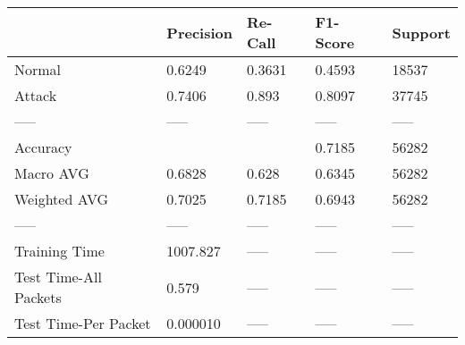 \begin{tabular}{lllll}
\toprule
{} & Precision & Re-Call & F1-Score & Support \\
\midrule
Normal                &    0.6249 &  0.3631 &   0.4593 &   18537 \\
Attack                &    0.7406 &   0.893 &   0.8097 &   37745 \\
-----                 &     ----- &   ----- &    ----- &   ----- \\
Accuracy              &           &         &   0.7185 &   56282 \\
Macro AVG             &    0.6828 &   0.628 &   0.6345 &   56282 \\
Weighted AVG          &    0.7025 &  0.7185 &   0.6943 &   56282 \\
-----                 &     ----- &   ----- &    ----- &   ----- \\
Training Time         &  1007.827 &   ----- &    ----- &   ----- \\
Test Time-All Packets &     0.579 &   ----- &    ----- &   ----- \\
Test Time-Per Packet  &  0.000010 &   ----- &    ----- &   ----- \\
\bottomrule
\end{tabular}
